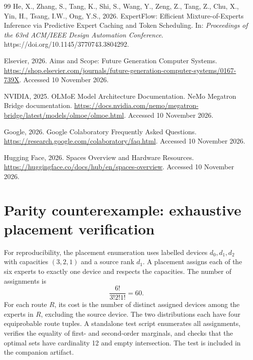 \documentclass[a4paper,preprint,review,12pt,authoryear]{elsarticle}
\begin{document}
\begin{thebibliography}{99}
He, X., Zhang, S., Tang, K., Shi, S., Wang, Y., Zeng, Z., Tang, Z., Chu, X., Yin, H., Tsang, I.W., Ong, Y.S., 2026. ExpertFlow: Efficient Mixture-of-Experts Inference via Predictive Expert Caching and Token Scheduling. In: \textit{Proceedings of the 63rd ACM/IEEE Design Automation Conference}. https://doi.org/10.1145/3770743.3804292.

Elsevier, 2026. Aims and Scope: Future Generation Computer Systems. \url{https://shop.elsevier.com/journals/future-generation-computer-systems/0167-739X}. Accessed 10 November 2026.

NVIDIA, 2025. OLMoE Model Architecture Documentation. NeMo Megatron Bridge documentation. \url{https://docs.nvidia.com/nemo/megatron-bridge/latest/models/olmoe/olmoe.html}. Accessed 10 November 2026.

Google, 2026. Google Colaboratory Frequently Asked Questions. \url{https://research.google.com/colaboratory/faq.html}. Accessed 10 November 2026.

Hugging Face, 2026. Spaces Overview and Hardware Resources. \url{https://huggingface.co/docs/hub/en/spaces-overview}. Accessed 10 November 2026.
\end{thebibliography}

\appendix
\section{Parity counterexample: exhaustive placement verification}
\label{app:parity}

For reproducibility, the placement enumeration uses labelled devices $d_0,d_1,d_2$ with capacities $(3,2,1)$ and a source rank $d_1$. A placement assigns each of the six experts to exactly one device and respects the capacities. The number of assignments is
\begin{equation}
 \frac{6!}{3!2!1!}=60.
\end{equation}
For each route $R$, its cost is the number of distinct assigned devices among the experts in $R$, excluding the source device. The two distributions each have four equiprobable route tuples. A standalone test script enumerates all assignments, verifies the equality of first- and second-order marginals, and checks that the optimal sets have cardinality 12 and empty intersection. The test is included in the companion artifact.
\end{document}
